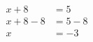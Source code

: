 \documentclass[varwidth]{standalone}
\begin{document}
    \begin{varwidth}{0.25\paperwidth}
    \begin{align*}
    x + 8 &= 5\\
    x + 8 - 8 &= 5 - 8\\
    x &= -3\\
\end{align*}
\end{varwidth}
\end{document}
